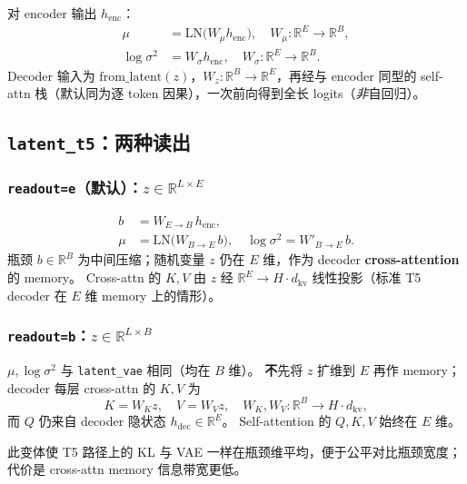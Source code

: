 \documentclass[UTF8,a4paper,11pt]{ctexart}
\begin{document}
对 encoder 输出 $h_{\mathrm{enc}}$：
\begin{align}
  \mu &= \mathrm{LN}\bigl(W_\mu h_{\mathrm{enc}}\bigr), \quad W_\mu: \mathbb{R}^{E}\!\to\!\mathbb{R}^{B}, \\
  \log\sigma^2 &= W_{\sigma} h_{\mathrm{enc}}, \quad W_{\sigma}: \mathbb{R}^{E}\!\to\!\mathbb{R}^{B}.
\end{align}
Decoder 输入为 $\mathrm{from\_latent}(z)$，$W_z: \mathbb{R}^{B}\!\to\!\mathbb{R}^{E}$，再经与 encoder 同型的 self-attn 栈（默认同为逐 token 因果），一次前向得到全长 logits（\emph{非}自回归）。

\subsection{\texttt{latent\_t5}：两种读出}

\subsubsection{\texttt{readout=e}（默认）：$z \in \mathbb{R}^{L \times E}$}

\begin{align}
  b &= W_{E\to B}\, h_{\mathrm{enc}}, \\
  \mu &= \mathrm{LN}\bigl(W_{B\to E}\, b\bigr), \quad
  \log\sigma^2 = W'_{B\to E}\, b.
\end{align}
瓶颈 $b\in\mathbb{R}^B$ 为中间压缩；随机变量 $z$ 仍在 $E$ 维，作为 decoder \textbf{cross-attention} 的 memory。
Cross-attn 的 $K,V$ 由 $z$ 经 $\mathbb{R}^{E}\!\to\!H\cdot d_{\mathrm{kv}}$ 线性投影（标准 T5 decoder 在 $E$ 维 memory 上的情形）。

\subsubsection{\texttt{readout=b}：$z \in \mathbb{R}^{L \times B}$}

$\mu,\log\sigma^2$ 与 \texttt{latent\_vae} 相同（均在 $B$ 维）。
\textbf{不}先将 $z$ 扩维到 $E$ 再作 memory；decoder 每层 cross-attn 的 $K,V$ 为
\begin{equation}
  K = W_K z,\quad V = W_V z,\quad W_K,W_V: \mathbb{R}^{B}\!\to\!H\cdot d_{\mathrm{kv}},
\end{equation}
而 $Q$ 仍来自 decoder 隐状态 $h_{\mathrm{dec}}\in\mathbb{R}^E$。
Self-attention 的 $Q,K,V$ 始终在 $E$ 维。

此变体使 T5 路径上的 KL 与 VAE 一样在瓶颈维平均，便于公平对比瓶颈宽度；代价是 cross-attn memory 信息带宽更低。
\end{document}
